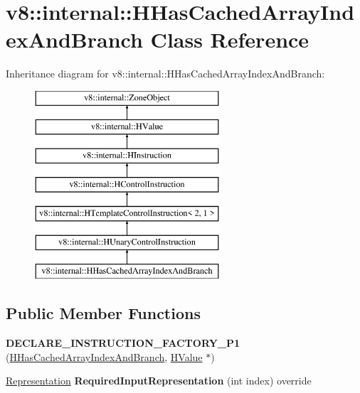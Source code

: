 \hypertarget{classv8_1_1internal_1_1_h_has_cached_array_index_and_branch}{}\section{v8\+:\+:internal\+:\+:H\+Has\+Cached\+Array\+Index\+And\+Branch Class Reference}
\label{classv8_1_1internal_1_1_h_has_cached_array_index_and_branch}
Inheritance diagram for v8\+:\+:internal\+:\+:H\+Has\+Cached\+Array\+Index\+And\+Branch\+:\begin{figure}[H]
\begin{center}
\leavevmode
\includegraphics[height=7.000000cm]{classv8_1_1internal_1_1_h_has_cached_array_index_and_branch}
\end{center}
\end{figure}
\subsection*{Public Member Functions}
\begin{DoxyCompactItemize}
\item 
{\bfseries D\+E\+C\+L\+A\+R\+E\+\_\+\+I\+N\+S\+T\+R\+U\+C\+T\+I\+O\+N\+\_\+\+F\+A\+C\+T\+O\+R\+Y\+\_\+\+P1} (\hyperlink{classv8_1_1internal_1_1_h_has_cached_array_index_and_branch}{H\+Has\+Cached\+Array\+Index\+And\+Branch}, \hyperlink{classv8_1_1internal_1_1_h_value}{H\+Value} $\ast$)\hypertarget{classv8_1_1internal_1_1_h_has_cached_array_index_and_branch_a60699e51734e9f7dcc9149ac9d6ad375}{}\label{classv8_1_1internal_1_1_h_has_cached_array_index_and_branch_a60699e51734e9f7dcc9149ac9d6ad375}

\item 
\hyperlink{classv8_1_1internal_1_1_representation}{Representation} {\bfseries Required\+Input\+Representation} (int index) override\hypertarget{classv8_1_1internal_1_1_h_has_cached_array_index_and_branch_a885a555935a60b3a49de889bff8ca3d9}{}\label{classv8_1_1internal_1_1_h_has_cached_array_index_and_branch_a885a555935a60b3a49de889bff8ca3d9}

\end{DoxyCompactItemize}
